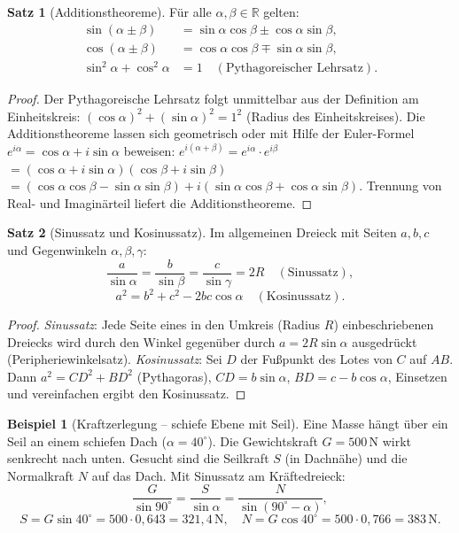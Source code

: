 ﻿\documentclass[a4paper,12pt]{report}
\theoremstyle{definition}
\newtheorem{beispiel}{Beispiel}
\newtheorem{satz}{Satz}
\begin{document}
\begin{satz}[Additionstheoreme]
F\"ur alle $\alpha, \beta \in \mathbb{R}$ gelten:
\begin{align*}
  \sin(\alpha \pm \beta) &= \sin\alpha\cos\beta \pm \cos\alpha\sin\beta, \\
  \cos(\alpha \pm \beta) &= \cos\alpha\cos\beta \mp \sin\alpha\sin\beta, \\
  \sin^2\alpha + \cos^2\alpha &= 1 \quad (\text{Pythagoreischer Lehrsatz}).
\end{align*}
\end{satz}
\begin{proof}
Der Pythagoreische Lehrsatz folgt unmittelbar aus der Definition am Einheitskreis:
$(\cos\alpha)^2 + (\sin\alpha)^2 = 1^2$ (Radius des Einheitskreises).
Die Additionstheoreme lassen sich geometrisch oder mit Hilfe der
Euler-Formel $e^{i\alpha} = \cos\alpha + i\sin\alpha$ beweisen:
$e^{i(\alpha+\beta)} = e^{i\alpha}\cdot e^{i\beta}$
$= (\cos\alpha + i\sin\alpha)(\cos\beta + i\sin\beta)$
$= (\cos\alpha\cos\beta - \sin\alpha\sin\beta) + i(\sin\alpha\cos\beta + \cos\alpha\sin\beta)$.
Trennung von Real- und Imagin\"arteil liefert die Additionstheoreme.
\end{proof}

\begin{satz}[Sinussatz und Kosinussatz]
Im allgemeinen Dreieck mit Seiten $a, b, c$ und Gegenwinkeln $\alpha, \beta, \gamma$:
\[
  \frac{a}{\sin\alpha} = \frac{b}{\sin\beta} = \frac{c}{\sin\gamma} = 2R \quad (\text{Sinussatz}),
\]
\[
  a^2 = b^2 + c^2 - 2bc\cos\alpha \quad (\text{Kosinussatz}).
\]
\end{satz}
\begin{proof}
\textit{Sinussatz}: Jede Seite eines in den Umkreis (Radius $R$)
einbeschriebenen Dreiecks wird durch den Winkel gegen\"uber durch
$a = 2R\sin\alpha$ ausgedr\"uckt (Peripheriewinkelsatz).
\textit{Kosinussatz}: Sei $D$ der Fu\ss{}punkt des Lotes von $C$ auf $AB$.
Dann $a^2 = CD^2 + BD^2$ (Pythagoras), $CD = b\sin\alpha$, $BD = c - b\cos\alpha$,
Einsetzen und vereinfachen ergibt den Kosinussatz.
\end{proof}

\begin{beispiel}[Kraftzerlegung -- schiefe Ebene mit Seil]
Eine Masse h\"angt \"uber ein Seil an einem schiefen Dach ($\alpha = 40^\circ$).
Die Gewichtskraft $G = 500\,\mathrm{N}$ wirkt senkrecht nach unten.
Gesucht sind die Seilkraft $S$ (in Dachn\"ahe) und die Normalkraft $N$ auf das Dach.
Mit Sinussatz am Kr\"aftedreieck:
\[
  \frac{G}{\sin 90^\circ} = \frac{S}{\sin\alpha} = \frac{N}{\sin(90^\circ-\alpha)},
\]
\[
  S = G\sin 40^\circ = 500 \cdot 0{,}643 = 321{,}4\,\mathrm{N}, \quad
  N = G\cos 40^\circ = 500 \cdot 0{,}766 = 383\,\mathrm{N}.
\]
\end{beispiel}
\end{document}

